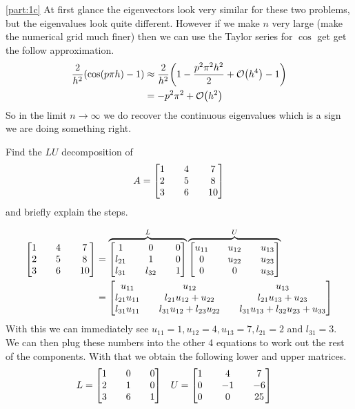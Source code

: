 \documentclass[boxes,pages]{homework}
\begin{document}
\begin{solution}
	\ref{part:1c}
	At first glance the eigenvectors look very similar for these two problems, but the eigenvalues look quite different. However if we make $n$ very large (make the numerical grid much finer) then we can use the Taylor series for $\cos$ get get the follow approximation.
	\begin{align*}
		\frac{2}{h^2}\qty(\cos(p\pi h) - 1) & \approx\frac{2}{h^2}\qty(1 - \frac{p^2\pi^2h^2}{2} + \order{h^4}- 1) \\
		                                    & =-p^2\pi^2 + \order{h^2}
	\end{align*}
	So in the limit $n\to\infty$ we do recover the continuous eigenvalues which is a sign we are doing something right.
\end{solution}

\begin{problem}
Find the $LU$ decomposition of
\begin{equation*}
	A = \mqty[1 && 4 && 7 \\ 2 && 5 && 8 \\ 3 && 6 && 10]
\end{equation*}
and briefly explain the steps.
\end{problem}

\begin{solution}
	\begin{align*}
		\mqty[1 && 4 && 7 \\ 2 && 5 && 8 \\ 3 && 6 && 10] &= \overbrace{\mqty[1 && 0 && 0 \\ l_{21} && 1 && 0 \\ l_{31} && l_{32} && 1]}^L \overbrace{\mqty[u_{11} && u_{12} && u_{13} \\ 0 && u_{22} && u_{23} \\ 0 && 0 && u_{33}]}^U \\
		&= \mqty[u_{11} && u_{12} && u_{13} \\ l_{21}u_{11} && l_{21}u_{12} + u_{22} && l_{21}u_{13} + u_{23} \\ l_{31}u_{11} && l_{31}u_{12} + l_{23}u_{22} && l_{31}u_{13} + l_{32}u_{23} + u_{33}]
	\end{align*}
	With this we can immediately see $u_{11} = 1, u_{12} = 4, u_{13} = 7, l_{21} = 2$ and $l_{31} = 3$. We can then plug these numbers into the other 4 equations to work out the rest of the components. With that we obtain the following lower and upper matrices.
	\begin{align*}
		L &= \mqty[1 && 0 && 0 \\ 2 && 1 && 0 \\ 3 && 6 && 1] & U & = \mqty[1 && 4 && 7 \\ 0 && -1 && -6 \\ 0 && 0 && 25]
	\end{align*}
\end{solution}
\end{document}
